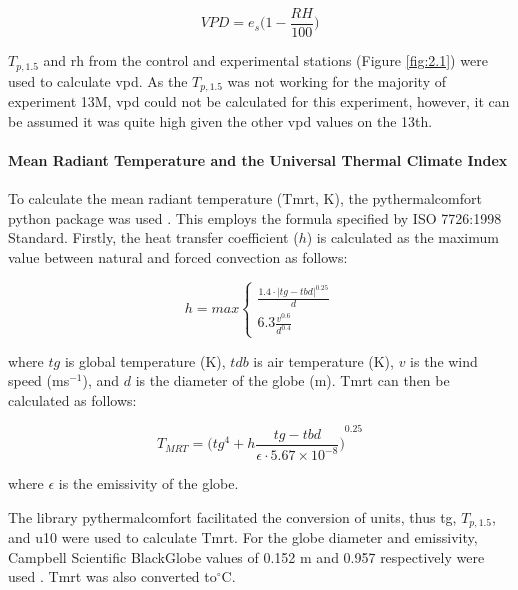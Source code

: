\documentclass[final,3p,times,authoryear]{elsarticle}
\begin{document}
\begin{equation}
VPD=e_{s}\bigg( 1 - \frac{RH}{100} \bigg)
\label{eq:7.8}
\end{equation}

$T_{p,1.5}$ and \gls{rh} from the control and experimental stations (Figure \ref{fig:2.1}) were used to
calculate \gls{vpd}. As the $T_{p,1.5}$ was not working for the majority of experiment 13M, \gls{vpd}
could not be calculated for this experiment, however, it can be assumed it was quite
high given the other \gls{vpd} values on the 13th.


\paragraph{Mean Radiant Temperature and the Universal Thermal Climate Index}\label{sec:appendix7.4.4}

To calculate the mean radiant temperature (\gls{Tmrt}, K), the pythermalcomfort python package was used \citep{Tartarini2020}. This employs the formula specified by ISO 7726:1998 Standard. Firstly, the heat transfer coefficient ($h$) is calculated as the maximum value between natural and forced convection as follows:

\begin{equation}
h = max \begin{cases}  \frac{  1.4 \cdot |tg-tbd|^{0.25} }{d} \\  6.3 \frac{v^{0.6}}{d^{0.4}} \end{cases}
\label{eq:7.9}
\end{equation}

where $tg$ is global temperature (K), $tdb$ is air temperature (K), $v$ is the wind speed (ms$^{-1}$), and $d$ is the diameter of the globe (m). \gls{Tmrt} can then be calculated as follows:

\begin{equation}
T_{MRT}=  {  \bigg( tg^{4} + h \frac{tg - tbd}{\epsilon \cdot 5.67\times 10^{-8}} \bigg)}^{0.25}
\label{eq:7.10}
\end{equation}

where $\epsilon$ is the emissivity of the globe.

The library pythermalcomfort facilitated the conversion of units, thus \gls{tg}, $T_{p,1.5}$, and \gls{u10} were used to calculate \gls{Tmrt}. For the globe diameter and emissivity, Campbell Scientific BlackGlobe values of 0.152 m and 0.957 respectively were used \citep{CampbellScientific2022}. \gls{Tmrt} was also converted to$^{\circ}$C.
\end{document}
